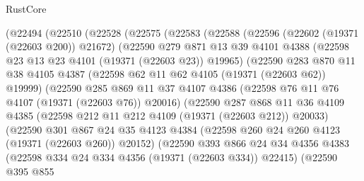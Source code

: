 \begin{lexlean}{RustCore}
\begin{coremodule}
              (@22494
                (@22510
                  (@22528
                    (@22575
                      (@22583
                        (@22588
                          (@22596
                            (@22602 (@19371 (@22603 @200)) @21672)
                            (@22590
                              @279
                              @871
                              @13
                              @39
                              @4101
                              @4388
                              (@22598 @23 @13 @23 @4101 (@19371 (@22603 @23)) @19965)
                              (@22590
                                @283
                                @870
                                @11
                                @38
                                @4105
                                @4387
                                (@22598 @62 @11 @62 @4105 (@19371 (@22603 @62)) @19999)
                                (@22590
                                  @285
                                  @869
                                  @11
                                  @37
                                  @4107
                                  @4386
                                  (@22598 @76 @11 @76 @4107 (@19371 (@22603 @76)) @20016)
                                  (@22590
                                    @287
                                    @868
                                    @11
                                    @36
                                    @4109
                                    @4385
                                    (@22598 @212 @11 @212 @4109 (@19371 (@22603 @212)) @20033)
                                    (@22590
                                      @301
                                      @867
                                      @24
                                      @35
                                      @4123
                                      @4384
                                      (@22598 @260 @24 @260 @4123 (@19371 (@22603 @260)) @20152)
                                      (@22590
                                        @393
                                        @866
                                        @24
                                        @34
                                        @4356
                                        @4383
                                        (@22598 @334 @24 @334 @4356 (@19371 (@22603 @334)) @22415)
                                        (@22590
                                          @395
                                          @855

\end{coremodule}
\end{lexlean}
